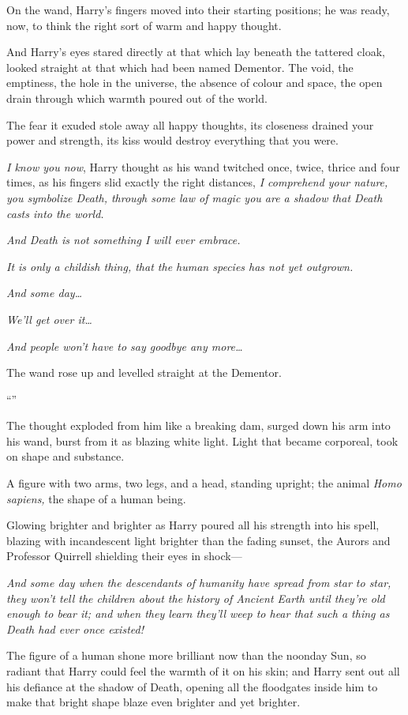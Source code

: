 On the wand, Harry’s fingers moved into their starting positions; he was ready, now, to think the right sort of warm and happy thought.

And Harry’s eyes stared directly at that which lay beneath the tattered cloak, looked straight at that which had been named Dementor. The void, the emptiness, the hole in the universe, the absence of colour and space, the open drain through which warmth poured out of the world.

The fear it exuded stole away all happy thoughts, its closeness drained your power and strength, its kiss would destroy everything that you were.

\emph{I know you now}, Harry thought as his wand twitched once, twice, thrice and four times, as his fingers slid exactly the right distances, \emph{I comprehend your nature, you symbolize Death, through some law of magic you are a shadow that Death casts into the world.}

\emph{And Death is not something I will ever embrace.}

\emph{It is only a childish thing, that the human species has not yet outgrown.}

\emph{And some day…}

\emph{We’ll get over it…}

\emph{And people won’t have to say goodbye any more…}

The wand rose up and levelled straight at the Dementor.

“\emph{}”

The thought exploded from him like a breaking dam, surged down his arm into his wand, burst from it as blazing white light. Light that became corporeal, took on shape and substance.

A figure with two arms, two legs, and a head, standing upright; the animal \emph{Homo sapiens,} the shape of a human being.

Glowing brighter and brighter as Harry poured all his strength into his spell, blazing with incandescent light brighter than the fading sunset, the Aurors and Professor Quirrell shielding their eyes in shock—

\emph{And some day when the descendants of humanity have spread from star to star, they won’t tell the children about the history of Ancient Earth until they’re old enough to bear it; and when they learn they’ll weep to hear that such a thing as Death had ever once existed!}

The figure of a human shone more brilliant now than the noonday Sun, so radiant that Harry could feel the warmth of it on his skin; and Harry sent out all his defiance at the shadow of Death, opening all the floodgates inside him to make that bright shape blaze even brighter and yet brighter.

